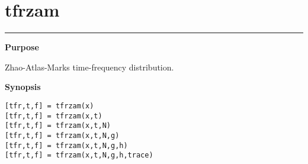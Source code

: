 

\section*{\hspace*{-1.6cm} tfrzam}

\vspace*{-.4cm}
\hspace*{-1.6cm}\rule[0in]{16.5cm}{.02cm}
\vspace*{.2cm}

{\bf \large \sf Purpose}\\
\hspace*{1.5cm}
\begin{minipage}[t]{13.5cm}
Zhao-Atlas-Marks time-frequency distribution.
\end{minipage}
\vspace*{.5cm}

{\bf \large \sf Synopsis}\\
\hspace*{1.5cm}
\begin{minipage}[t]{13.5cm}
\begin{verbatim}
[tfr,t,f] = tfrzam(x)
[tfr,t,f] = tfrzam(x,t)
[tfr,t,f] = tfrzam(x,t,N)
[tfr,t,f] = tfrzam(x,t,N,g)
[tfr,t,f] = tfrzam(x,t,N,g,h)
[tfr,t,f] = tfrzam(x,t,N,g,h,trace)
\end{verbatim}
\end{minipage}
\vspace*{.5cm}

